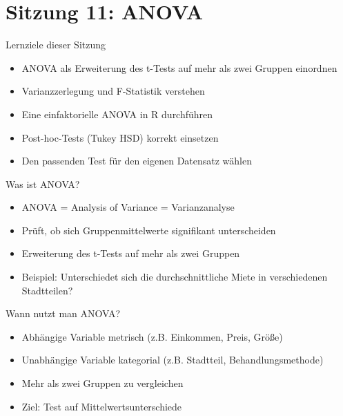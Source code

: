 \documentclass[
  ignorenonframetext,
]{beamer}
\providecommand{\tightlist}{%
  \setlength{\itemsep}{0pt}\setlength{\parskip}{0pt}}
\begin{document}
\begin{frame}
\end{frame}

\section{Sitzung 11: ANOVA}\label{sitzung-11-anova}

\begin{frame}{Lernziele dieser Sitzung}
\protect{}\label{lernziele-dieser-sitzung-10}
\begin{itemize}
\tightlist
\item
  ANOVA als Erweiterung des t-Tests auf mehr als zwei Gruppen einordnen
\item
  Varianzzerlegung und F-Statistik verstehen
\item
  Eine einfaktorielle ANOVA in R durchführen
\item
  Post-hoc-Tests (Tukey HSD) korrekt einsetzen
\item
  Den passenden Test für den eigenen Datensatz wählen
\end{itemize}
\end{frame}

\begin{frame}{Was ist ANOVA?}
\protect{}\label{was-ist-anova}
\begin{itemize}
\tightlist
\item
  ANOVA = Analysis of Variance = Varianzanalyse
\item
  Prüft, ob sich Gruppenmittelwerte signifikant unterscheiden
\item
  Erweiterung des t-Tests auf mehr als zwei Gruppen
\item
  Beispiel: Unterschiedet sich die durchschnittliche Miete in
  verschiedenen Stadtteilen?
\end{itemize}
\end{frame}

\begin{frame}{Wann nutzt man ANOVA?}
\protect{}\label{wann-nutzt-man-anova}
\begin{itemize}
\tightlist
\item
  Abhängige Variable metrisch (z.B. Einkommen, Preis, Größe)
\item
  Unabhängige Variable kategorial (z.B. Stadtteil, Behandlungsmethode)
\item
  Mehr als zwei Gruppen zu vergleichen
\item
  Ziel: Test auf Mittelwertsunterschiede
\end{itemize}
\end{frame}
\end{document}
